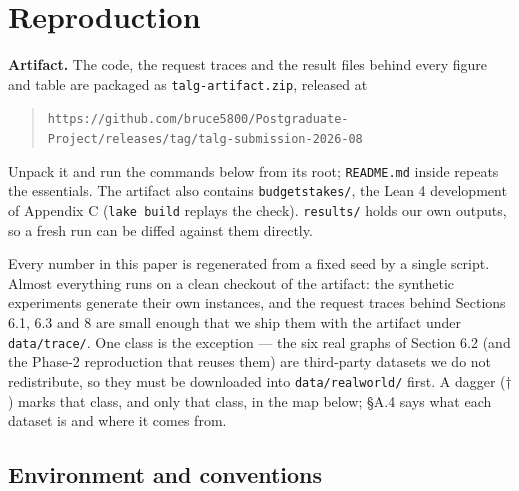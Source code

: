 \section{Reproduction}

\textbf{Artifact.} The code, the request traces and the result files
behind every figure and table are packaged as
\texttt{talg-artifact.zip}, released at

\begin{quote}
\texttt{https://github.com/bruce5800/Postgraduate-Project/releases/tag/talg-submission-2026-08}
\end{quote}

Unpack it and run the commands below from its root; \texttt{README.md}
inside repeats the essentials. The artifact also contains
\texttt{budgetstakes/}, the Lean 4 development of Appendix C
(\texttt{lake\ build} replays the check). \texttt{results/} holds our
own outputs, so a fresh run can be diffed against them directly.

Every number in this paper is regenerated from a fixed seed by a single
script. Almost everything runs on a clean checkout of the artifact: the
synthetic experiments generate their own instances, and the request
traces behind Sections 6.1, 6.3 and 8 are small enough that we ship them
with the artifact under \texttt{data/trace/}. One class is the exception
--- the six real graphs of Section 6.2 (and the Phase-2 reproduction
that reuses them) are third-party datasets we do not redistribute, so
they must be downloaded into \texttt{data/realworld/} first. A dagger
(\(\dagger\)) marks that class, and only that class, in the map below;
§A.4 says what each dataset is and where it comes from.

\subsection{Environment and
conventions}

